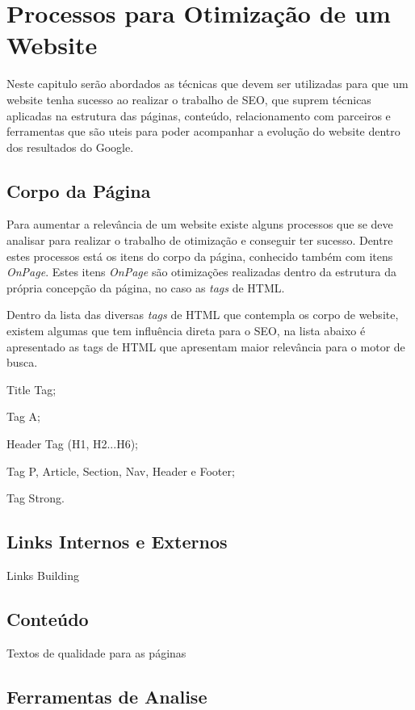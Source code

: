 \documentclass[
	12pt,				%
	openright,			%
	twoside,			%
	a4paper,			%
	english,			%
	french,				%
	spanish,			%
	brazil				%
	]{abntex2}
\begin{document}
\chapter{Processos para Otimização de um Website}

Neste capitulo serão abordados as técnicas que devem ser utilizadas para que um website tenha sucesso ao realizar o trabalho de SEO, que suprem técnicas aplicadas na estrutura das páginas, conteúdo, relacionamento com parceiros e ferramentas que são uteis para poder acompanhar a evolução do website dentro dos resultados do Google.

\section{Corpo da Página}

Para aumentar a relevância de um website existe alguns processos que se deve analisar para realizar o trabalho de otimização e conseguir ter sucesso. Dentre estes processos está os itens do corpo da página, conhecido também com itens \textit{OnPage}. Estes itens \textit{OnPage} são otimizações realizadas dentro da estrutura da própria concepção da página, no caso as \textit{tags} de HTML.

Dentro da lista das diversas \textit{tags} de HTML que contempla os corpo de website, existem algumas que tem influência direta para o SEO, na lista abaixo é apresentado as tags de HTML que apresentam maior relevância para o motor de busca.

\item Title Tag;
\item Tag A;
\item Header Tag (H1, H2...H6);
\item Tag P, Article, Section, Nav, Header e Footer;
\item Tag Strong.

\section{Links Internos e Externos}

Links Building

\section{Conteúdo}

Textos de qualidade para as páginas

\section{Ferramentas de Analise}
\end{document}
